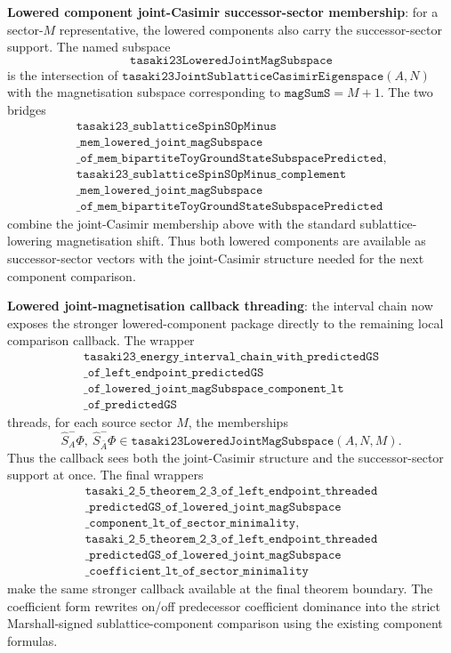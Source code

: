 \documentclass[a4paper,11pt]{article}
\begin{document}
\textbf{Lowered component joint-Casimir successor-sector membership}: for
a sector-\(M\) representative, the lowered components also carry the
successor-sector support.  The named subspace
\[
\texttt{tasaki23LoweredJointMagSubspace}
\]
is the intersection of
\(\texttt{tasaki23JointSublatticeCasimirEigenspace}(A,N)\) with the
magnetisation subspace corresponding to \(\texttt{magSumS}=M+1\).  The
two bridges
\[
\begin{gathered}
\texttt{tasaki23\_sublatticeSpinSOpMinus}\\
\texttt{\_mem\_lowered\_joint\_magSubspace}\\
\texttt{\_of\_mem\_bipartiteToyGroundStateSubspacePredicted},\\
\texttt{tasaki23\_sublatticeSpinSOpMinus\_complement}\\
\texttt{\_mem\_lowered\_joint\_magSubspace}\\
\texttt{\_of\_mem\_bipartiteToyGroundStateSubspacePredicted}
\end{gathered}
\]
combine the joint-Casimir membership above with the standard
sublattice-lowering magnetisation shift.  Thus both lowered components
are available as successor-sector vectors with the joint-Casimir
structure needed for the next component comparison.

\textbf{Lowered joint-magnetisation callback threading}: the interval
chain now exposes the stronger lowered-component package directly to the
remaining local comparison callback.  The wrapper
\[
\begin{gathered}
\texttt{tasaki23\_energy\_interval\_chain\_with\_predictedGS}\\
\texttt{\_of\_left\_endpoint\_predictedGS}\\
\texttt{\_of\_lowered\_joint\_magSubspace\_component\_lt}\\
\texttt{\_of\_predictedGS}
\end{gathered}
\]
threads, for each source sector \(M\), the memberships
\[
  \hat S_A^-\Phi,\ \hat S_{\bar A}^-\Phi
    \in \texttt{tasaki23LoweredJointMagSubspace}(A,N,M).
\]
Thus the callback sees both the joint-Casimir structure and the
successor-sector support at once.  The final wrappers
\[
\begin{gathered}
\texttt{tasaki\_2\_5\_theorem\_2\_3\_of\_left\_endpoint\_threaded}\\
\texttt{\_predictedGS\_of\_lowered\_joint\_magSubspace}\\
\texttt{\_component\_lt\_of\_sector\_minimality},\\
\texttt{tasaki\_2\_5\_theorem\_2\_3\_of\_left\_endpoint\_threaded}\\
\texttt{\_predictedGS\_of\_lowered\_joint\_magSubspace}\\
\texttt{\_coefficient\_lt\_of\_sector\_minimality}
\end{gathered}
\]
make the same stronger callback available at the final theorem
boundary.  The coefficient form rewrites on/off predecessor coefficient
dominance into the strict Marshall-signed sublattice-component
comparison using the existing component formulas.
\end{document}
